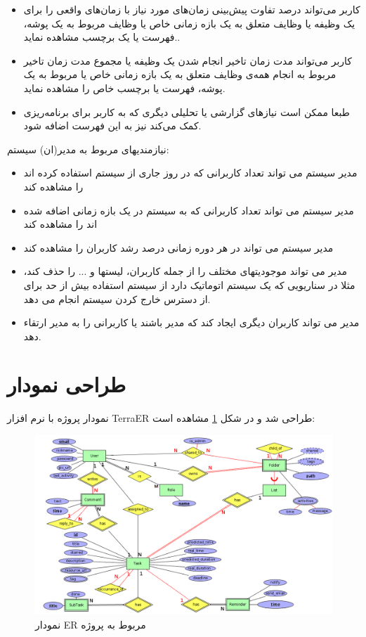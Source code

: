 \documentclass{article}
\begin{document}
\begin{itemize}
\item کاربر می‌تواند درصد تفاوت پیش‌بینی‌ زمان‌های مورد نیاز با زمان‌های واقعی را برای یک وظیفه یا وظایف متعلق به یک بازه زمانی خاص یا وظایف مربوط به یک پوشه، فهرست یا یک برچسب مشاهده نماید..

\item  کاربر می‌تواند مدت زمان تاخیر انجام شدن یک وظیفه یا مجموع مدت زمان تاخیر مربوط به انجام همه‌ی وظایف متعلق به یک بازه زمانی خاص یا مربوط به یک پوشه، فهرست یا برچسب خاص را مشاهده نماید.

\item طبعا ممکن است نیاز‌های گزارشی یا تحلیلی دیگری که به کاربر برای برنامه‌ریزی کمک می‌کند نیز به این فهرست اضافه شود.

\end{itemize}
نیازمندیهای مربوط به مدیر(ان) سیستم:
\begin{itemize}
	\item
	مدیر سیستم می تواند تعداد کاربرانی که در روز جاری از سیستم استفاده کرده اند را مشاهده کند
	\item
	مدیر سیستم می تواند تعداد کاربرانی که به سیستم در یک بازه زمانی اضافه شده اند را مشاهده کند
	\item
	مدیر سیستم می تواند در هر دوره زمانی درصد رشد کاربران را مشاهده کند
	\item
	مدیر می تواند موجودیتهای مختلف را از جمله کاربران، لیستها و ... را حذف کند، مثلا در سناریویی که یک سیستم اتوماتیک دارد از سیستم استفاده بیش از حد برای از دسترس خارج کردن سیستم انجام می دهد. 
	\item
	مدیر می تواند کاربران دیگری ایجاد کند که مدیر باشند یا کاربرانی را به مدیر ارتقاء دهد.  
\end{itemize}

\section*{طراحی نمودار}
نمودار پروژه با نرم افزار TerraER طراحی شد و در شکل \ref{fig:er} مشاهده است:
\begin{figure}[ht]
  \centering  
  \includegraphics[width = 1\textwidth]{er.png}
  \caption{نمودار ER مربوط به پروژه}
  \label{fig:er}
\end{figure}
\end{document}
